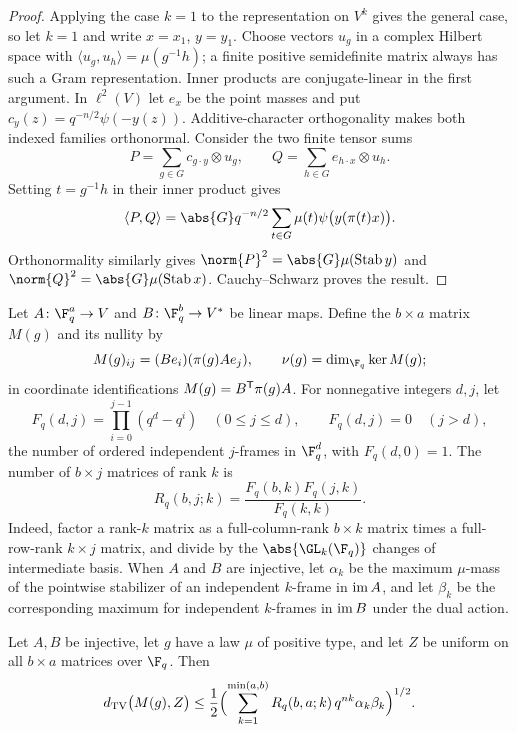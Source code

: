 \begin{proof}
Applying the case $k=1$ to the representation on $V^k$ gives the general case,
so let $k=1$ and write $x=x_1$, $y=y_1$. Choose vectors $u_g$ in a complex
Hilbert space with $\langle u_g,u_h\rangle=\mu(g^{-1}h)$; a finite positive
semidefinite matrix always has such a Gram representation. Inner products are
conjugate-linear in the first argument. In $\ell^2(V)$ let $e_x$ be the point
masses and put $c_y(z)=q^{-n/2}\psi(-y(z))$. Additive-character orthogonality
makes both indexed families orthonormal. Consider the two finite tensor sums
\[
 P=\sum_{g\in G}c_{g\cdot y}\otimes u_g,\qquad
 Q=\sum_{h\in G}e_{h\cdot x}\otimes u_h .
\]
Setting $t=g^{-1}h$ in their inner product gives
\[
 \langle P,Q\rangle
 =\abs{G}q^{-n/2}\sum_{t\in G}\mu(t)\psi\bigl(y(\pi(t)x)\bigr).
\]
Orthonormality similarly gives $\norm{P}^2=\abs{G}\mu(\spnStab y)$ and
$\norm{Q}^2=\abs{G}\mu(\spnStab x)$. Cauchy--Schwarz proves the result.
\end{proof}

Let $A\colon\F_q^a\to V$ and $B\colon\F_q^b\to V^*$ be linear maps. Define the
$b\times a$ matrix $M(g)$ and its nullity by
\[
 M(g)_{ij}=(Be_i)(\pi(g)Ae_j),\qquad\nu(g)=\dim_{\F_q}\ker M(g);
\]
in coordinate identifications $M(g)=B^{\mathsf{T}}\pi(g)A$. For nonnegative
integers $d,j$, let
\[
 F_q(d,j)=\prod_{i=0}^{j-1}(q^d-q^i)\quad(0\le j\le d),\qquad
 F_q(d,j)=0\quad(j>d),
\]
the number of ordered independent $j$-frames in $\F_q^d$, with $F_q(d,0)=1$.
The number of $b\times j$ matrices of rank $k$ is
\begin{equation}\label{spn:eq:rank-matrix-count}
 R_q(b,j;k)=\frac{F_q(b,k)F_q(j,k)}{F_q(k,k)} .
\end{equation}
Indeed, factor a rank-$k$ matrix as a full-column-rank $b\times k$ matrix
times a full-row-rank $k\times j$ matrix, and divide by the
$\abs{\GL_k(\F_q)}$ changes of intermediate basis. When $A$ and $B$ are
injective, let $\alpha_k$ be the maximum $\mu$-mass of the pointwise
stabilizer of an independent $k$-frame in $\operatorname{im} A$, and let $\beta_k$ be
the corresponding maximum for independent $k$-frames in $\operatorname{im} B$ under the
dual action.

\begin{theorem}\label{spn:thm:tv}
Let $A,B$ be injective, let $g$ have a law $\mu$ of positive type, and let $Z$
be uniform on all $b\times a$ matrices over $\F_q$. Then
\begin{equation}\label{spn:eq:inherited-TV}
 d_{\mathrm{TV}}\bigl(M(g),Z\bigr)\le\frac12\Bigl(\sum_{k=1}^{\min(a,b)}
 R_q(b,a;k)\,q^{nk}\alpha_k\beta_k\Bigr)^{1/2}.
\end{equation}
\end{theorem}


